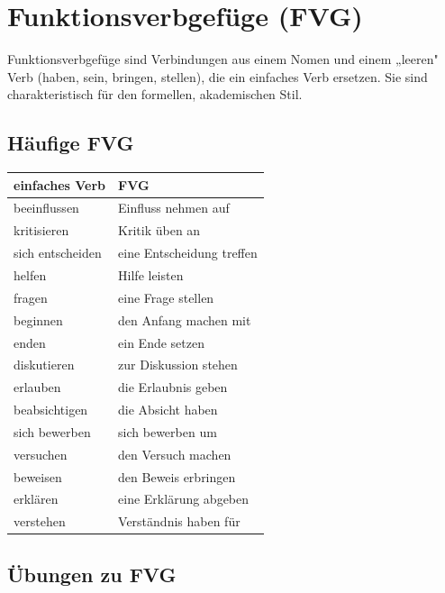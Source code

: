\chapter{Funktionsverbgefüge (FVG)}
\label{cha:FVG}

Funktionsverbgefüge sind Verbindungen aus einem Nomen und einem „leeren" Verb (haben, sein, bringen, stellen), die ein einfaches Verb ersetzen. Sie sind charakteristisch für den formellen, akademischen Stil.

\section{Häufige FVG}
\label{sec:FVGHaeufig}

\begin{center}
\begin{tabular}{|l|l|}
\hline
\textbf{einfaches Verb} & \textbf{FVG} \\ \hline
beeinflussen & Einfluss nehmen auf \\ \hline
kritisieren & Kritik üben an \\ \hline
sich entscheiden & eine Entscheidung treffen \\ \hline
helfen & Hilfe leisten \\ \hline
fragen & eine Frage stellen \\ \hline
beginnen & den Anfang machen mit \\ \hline
enden & ein Ende setzen \\ \hline
diskutieren & zur Diskussion stehen \\ \hline
erlauben & die Erlaubnis geben \\ \hline
beabsichtigen & die Absicht haben \\ \hline
sich bewerben & sich bewerben um \\ \hline
versuchen & den Versuch machen \\ \hline
beweisen & den Beweis erbringen \\ \hline
erklären & eine Erklärung abgeben \\ \hline
verstehen & Verständnis haben für \\ \hline
\end{tabular}
\end{center}

\section{Übungen zu FVG}
\label{sec:FVGUebungen}

